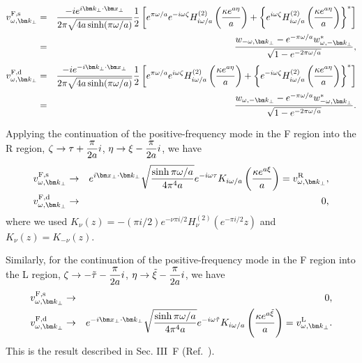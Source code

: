\documentclass[aps,prd,preprintnumbers,nofootinbib,showpacs]{revtex4}%
\begin{document}
\begin{widetext}
\begin{eqnarray}
v^{\rm F,s}_{\omega,\bm k_\perp}&=& 
{-ie^{i\bm k_\perp\cdot \bm x_\perp}\over 2\pi\sqrt{4a\sinh (\pi \omega/a)}}
{1\over 2}
\left[e^{\pi \omega/a} e^{-i\omega\zeta} H_{i\omega/a}^{(2)}\left({\kappa e^{a\eta}\over a}\right)
+\left\{e^{i\omega\zeta} H_{i\omega/a}^{(2)}\left({\kappa e^{a\eta}\over a}\right)\right\}^*
\right]
\nonumber\\
&=&
{w_{-\omega,\bm k_\perp}-e^{-\pi\omega/a}w_{\omega,-\bm k_\perp}^*\over \sqrt{1-e^{-2\pi\omega/a}}},
\end{eqnarray}
\begin{eqnarray}
v^{\rm F,d}_{\omega,\bm k_\perp}&=& 
{-ie^{-i\bm k_\perp\cdot \bm x_\perp}\over 2\pi\sqrt{4a\sinh (\pi \omega/a)}}
{1\over 2}
\left[e^{\pi \omega/a} e^{i\omega\zeta} H_{i\omega/a}^{(2)}\left({\kappa e^{a\eta}\over a}\right)
+\left\{e^{-i\omega\zeta} H_{i\omega/a}^{(2)}\left({\kappa e^{a\eta}\over a}\right)\right\}^*
\right]
\nonumber\\
&=&
{w_{\omega,-\bm k_\perp}-e^{-\pi\omega/a}w_{-\omega,\bm k_\perp}^*\over \sqrt{1-e^{-2\pi\omega/a}}}.
\end{eqnarray}

Applying the continuation of the positive-frequency mode in the F region into the R region, 
$\displaystyle{\zeta\rightarrow\tau+{\pi \over 2a }i}$, 
 $\displaystyle{\eta\rightarrow\xi-{\pi \over 2a}i}$,
we have
\begin{eqnarray}
v^{\rm F,s}_{\omega,\bm k_\perp}&\rightarrow&{e^{i\bm x_\perp\cdot\bm k_\perp}}\sqrt{\sinh\pi\omega/a\over 4\pi^4a}e^{-i\omega\tau}K_{i\omega/a} 
\left({\kappa e^{a\xi}\over a}\right)=v^{\rm R}_{\omega,\bm k_\perp},
\\
v^{\rm F,d}_{\omega,\bm k_\perp}&\rightarrow&0 ,
\end{eqnarray}
where we used $K_\nu(z)=-(\pi i/2)e^{-\nu\pi i/2}H_\nu^{(2)}(e^{-\pi i/2}z)$ and $K_\nu(z)=K_{-\nu}(z)$.

Similarly, for the continuation of the positive-frequency mode in the F region into the L region, 
 $\displaystyle{ \zeta\rightarrow -\tilde\tau-{\pi \over 2a }i}$,
 $\displaystyle{ \eta\rightarrow\tilde\xi-{\pi \over 2a}i}$,
we have
\begin{eqnarray}
v^{\rm F,s}_{\omega,\bm k_\perp}&\rightarrow&0,
\\
v^{\rm F,d}_{\omega,\bm k_\perp}&\rightarrow&{e^{-i\bm x_\perp\cdot\bm k_\perp}}\sqrt{\sinh\pi\omega/a\over 4\pi^4a}e^{-i\omega\tilde\tau}K_{i\omega/a} 
\left({\kappa e^{a\tilde\xi}\over a}\right)=v^{\rm L}_{\omega,\bm k_\perp} .
\end{eqnarray}
This is the result described in Sec. III~F (Ref.~\cite{Higuchi}).


\end{widetext}
\end{document}
